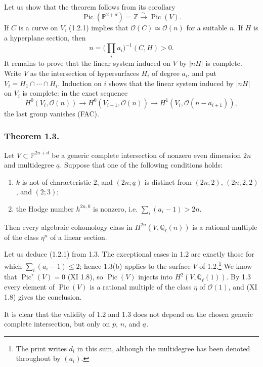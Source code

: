 Let us show that the theorem follows from its corollary
\begin{equation}\tag{1.2.1}
\operatorname{Pic}(\mathbb P^{2+d})=\mathbb Z
\xrightarrow{\ \sim\ }\operatorname{Pic}(V).
\end{equation}
If $C$ is a curve on $V$, (1.2.1) implies that
$\mathcal O(C)\simeq\mathcal O(n)$ for a suitable $n$.  If $H$ is a
hyperplane section, then
\[
n=\bigl(\textstyle\prod_i a_i\bigr)^{-1}(C,H)>0.
\]
It remains to prove that the linear system induced on $V$ by $|nH|$ is
complete.  Write $V$ as the intersection of hypersurfaces $H_i$ of degree
$a_i$, and put $V_i=H_1\cap\cdots\cap H_i$.  Induction on $i$ shows that the
linear system induced by $|nH|$ on $V_i$ is complete: in the exact sequence
\[
H^0(V_i,\mathcal O(n))\longrightarrow
H^0(V_{i+1},\mathcal O(n))\longrightarrow
H^1(V_i,\mathcal O(n-a_{i+1})),
\]
the last group vanishes (FAC).

\subsubsection*{Theorem 1.3.}
Let $V\subset\mathbb P^{2n+d}$ be a generic complete intersection of
nonzero even dimension $2n$ and multidegree $\underline a$.  Suppose that
one of the following conditions holds:
\begin{enumerate}[label=(\alph*)]
\item $k$ is not of characteristic $2$, and $(2n;\underline a)$ is distinct
  from $(2n;2)$, $(2n;2,2)$, and $(2;3)$;
\item the Hodge number $h^{2n,0}$ is nonzero, i.e.
  $\sum_i(a_i-1)>2n$.
\end{enumerate}
Then every algebraic cohomology class in
$H^{2n}(V,\mathbb Q_\ell(n))$ is a rational multiple of the class
$\eta^n$ of a linear section.

Let us deduce (1.2.1) from 1.3.  The exceptional cases in 1.2 are exactly
those for which $\sum_i(a_i-1)\leq2$; hence 1.3(b) applies to the surface
$V$ of 1.2.\footnote{The print writes $d_i$ in this sum, although the
multidegree has been denoted throughout by $(a_i)$.}  We know that
$\operatorname{Pic}^{\tau}(V)=0$ (XI 1.8), so
$\operatorname{Pic}(V)$ injects into $H^2(V,\mathbb Q_\ell(1))$.
By 1.3 every element of $\operatorname{Pic}(V)$ is a rational multiple of
the class $\eta$ of $\mathcal O(1)$, and (XI 1.8) gives the conclusion.

It is clear that the validity of 1.2 and 1.3 does not depend on the chosen
generic complete intersection, but only on $p$, $n$, and $\underline a$.

